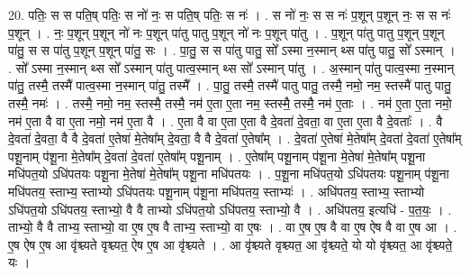 \documentclass[17pt]{extarticle}
\begin{document}
20. पतिः॒ स स पति॒ष् पतिः॒ स नो॑ नः॒ स पति॒ष् पतिः॒ स नः॑ । . स नो॑ नः॒ स स नः॑ प॒शून् प॒शून् नः॒ स स नः॑ प॒शून् । . नः॒ प॒शून् प॒शून् नो॑ नः प॒शून् पा॑तु पातु प॒शून् नो॑ नः प॒शून् पा॑तु । . प॒शून् पा॑तु पातु प॒शून् प॒शून् पा॑तु॒ स स पा॑तु प॒शून् प॒शून् पा॑तु॒ सः । . पा॒तु॒ स स पा॑तु पातु॒ सो᳚ ऽस्मा न॒स्मान् थ्स पा॑तु पातु॒ सो᳚ ऽस्मान् । . सो᳚ ऽस्मा न॒स्मान् थ्स सो᳚ ऽस्मान् पा॑तु पात्व॒स्मान् थ्स सो᳚ ऽस्मान् पा॑तु । . अ॒स्मान् पा॑तु पात्व॒स्मा न॒स्मान् पा॑तु॒ तस्मै॒ तस्मै॑ पात्व॒स्मा न॒स्मान् पा॑तु॒ तस्मै᳚ । . पा॒तु॒ तस्मै॒ तस्मै॑ पातु पातु॒ तस्मै॒ नमो॒ नम॒ स्तस्मै॑ पातु पातु॒ तस्मै॒ नमः॑ । . तस्मै॒ नमो॒ नम॒ स्तस्मै॒ तस्मै॒ नम॑ ए॒ता ए॒ता नम॒ स्तस्मै॒ तस्मै॒ नम॑ ए॒ताः । . नम॑ ए॒ता ए॒ता नमो॒ नम॑ ए॒ता वै वा ए॒ता नमो॒ नम॑ ए॒ता वै । . ए॒ता वै वा ए॒ता ए॒ता वै दे॒वता॑ दे॒वता॒ वा ए॒ता ए॒ता वै दे॒वताः᳚ । . वै दे॒वता॑ दे॒वता॒ वै वै दे॒वता॑ ए॒तेषा॑ मे॒तेषा᳚म् दे॒वता॒ वै वै दे॒वता॑ ए॒तेषा᳚म् । . दे॒वता॑ ए॒तेषा॑ मे॒तेषा᳚म् दे॒वता॑ दे॒वता॑ ए॒तेषा᳚म् पशू॒नाम् प॑शू॒ना मे॒तेषा᳚म् दे॒वता॑ दे॒वता॑ ए॒तेषा᳚म् पशू॒नाम् । . ए॒तेषा᳚म् पशू॒नाम् प॑शू॒ना मे॒तेषा॑ मे॒तेषा᳚म् पशू॒ना मधि॑पत॒यो ऽधि॑पतयः पशू॒ना मे॒तेषा॑ मे॒तेषा᳚म् पशू॒ना मधि॑पतयः । . प॒शू॒ना मधि॑पत॒यो ऽधि॑पतयः पशू॒नाम् प॑शू॒ना मधि॑पतय॒ स्ताभ्य॒ स्ताभ्यो ऽधि॑पतयः पशू॒नाम् प॑शू॒ना मधि॑पतय॒ स्ताभ्यः॑ । . अधि॑पतय॒ स्ताभ्य॒ स्ताभ्यो ऽधि॑पत॒यो ऽधि॑पतय॒ स्ताभ्यो॒ वै वै ताभ्यो ऽधि॑पत॒यो ऽधि॑पतय॒ स्ताभ्यो॒ वै । . अधि॑पतय॒ इत्यधि॑ - प॒त॒यः॒ । . ताभ्यो॒ वै वै ताभ्य॒ स्ताभ्यो॒ वा ए॒ष ए॒ष वै ताभ्य॒ स्ताभ्यो॒ वा ए॒षः । . वा ए॒ष ए॒ष वै वा ए॒ष ऐष वै वा ए॒ष आ । . ए॒ष ऐष ए॒ष आ वृ॑श्च्यते वृश्च्यत॒ ऐष ए॒ष आ वृ॑श्च्यते । . आ वृ॑श्च्यते वृश्च्यत॒ आ वृ॑श्च्यते॒ यो यो वृ॑श्च्यत॒ आ वृ॑श्च्यते॒ यः । \newline
\end{document}
